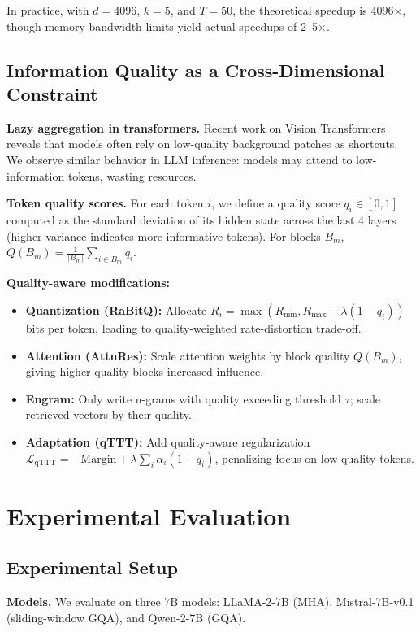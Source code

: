 \documentclass[11pt,a4paper]{article}
\theoremstyle{plain}
\theoremstyle{definition}
\begin{document}
In practice, with $d=4096$, $k=5$, and $T=50$, the theoretical speedup is 4096$\times$, though memory bandwidth limits yield actual speedups of 2--5$\times$.

\subsection{Information Quality as a Cross-Dimensional Constraint}
\label{sec:quality}

\textbf{Lazy aggregation in transformers.} Recent work on Vision Transformers~\cite{shi2026vision} reveals that models often rely on low-quality background patches as shortcuts. We observe similar behavior in LLM inference: models may attend to low-information tokens, wasting resources.

\textbf{Token quality scores.} For each token $i$, we define a quality score $q_i \in [0,1]$ computed as the standard deviation of its hidden state across the last 4 layers (higher variance indicates more informative tokens). For blocks $B_m$, $Q(B_m) = \frac{1}{|B_m|}\sum_{i\in B_m} q_i$.

\textbf{Quality-aware modifications:}
\begin{itemize}
    \item \textbf{Quantization (RaBitQ):} Allocate $R_i = \max(R_{\min}, R_{\max} - \lambda(1-q_i))$ bits per token, leading to quality-weighted rate-distortion trade-off.
    \item \textbf{Attention (AttnRes):} Scale attention weights by block quality $Q(B_m)$, giving higher-quality blocks increased influence.
    \item \textbf{Engram:} Only write n-grams with quality exceeding threshold $\tau$; scale retrieved vectors by their quality.
    \item \textbf{Adaptation (qTTT):} Add quality-aware regularization $\mathcal{L}_{\text{qTTT}} = -\text{Margin} + \lambda \sum_i \alpha_i (1-q_i)$, penalizing focus on low-quality tokens.
\end{itemize}

\section{Experimental Evaluation}
\label{sec:experiments}

\subsection{Experimental Setup}
\textbf{Models.} We evaluate on three 7B models: LLaMA-2-7B (MHA), Mistral-7B-v0.1 (sliding-window GQA), and Qwen-2-7B (GQA).
\end{document}
